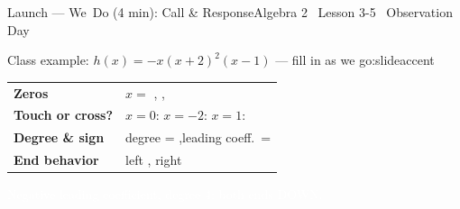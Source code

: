 \documentclass[aspectratio=169, 11pt]{beamer}
\begin{document}
\begin{frame}{Launch --- We~Do (4 min): Call \& Response}{Algebra 2 \textperiodcentered\ Lesson 3-5 \textperiodcentered\ Observation Day}
\vspace{0.2cm}
\begin{projcard}{Class example: $h(x) = -x(x+2)^2(x-1)$ --- fill in as we go:}{slideaccent}
\begin{tabular}{p{1.5in}p{3.0in}}
\textbf{Zeros} & $x = $ \underline{\hspace{0.5cm}}, \underline{\hspace{0.5cm}}, \underline{\hspace{0.5cm}} \\[6pt]
\textbf{Touch or cross?} & $x=0$: \underline{\hspace{1.2cm}}\quad $x=-2$: \underline{\hspace{1.2cm}}\quad $x=1$: \underline{\hspace{1.2cm}} \\[6pt]
\textbf{Degree \& sign} & degree = \underline{\hspace{0.5cm}},\quad leading coeff.\ = \underline{\hspace{0.5cm}} \\[6pt]
\textbf{End behavior} & left \underline{\hspace{1.2cm}}, right \underline{\hspace{1.2cm}} \\
\end{tabular}
\vspace{0.1cm}
\small\textcolor{white}{Negative leading coefficient, degree 4: both ends DOWN.}
\end{projcard}
\end{frame}
\end{document}
